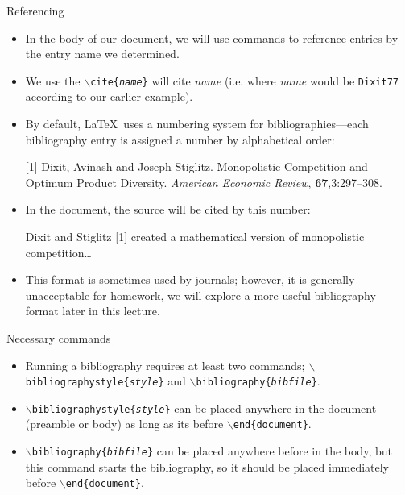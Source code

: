 \documentclass[pdf]{prosper}
\begin{document}
\begin{slide}{Referencing}
	\begin{itemize}
		\item In the body of our document, we will use commands to reference entries by the entry name we determined.
		\item We use the \texttt{$\backslash$cite\{\textit{name}\}} will cite \textit{name} (i.e. where \textit{name} would be \texttt{Dixit77} according to our earlier example).
		\item By default, \LaTeX\ uses a numbering system for bibliographies---each bibliography entry is assigned a number by alphabetical order:
			\begin{center}
				[1] Dixit, Avinash and Joseph Stiglitz. Monopolistic Competition and Optimum Product Diversity. \textit{American Economic Review}, \textbf{67},3:297--308.
			\end{center}
		\item In the document, the source will be cited by this number:
			\begin{center}
				Dixit and Stiglitz [1] created a mathematical version of monopolistic competition\ldots
			\end{center}
		\item This format is sometimes used by journals; however, it is generally unacceptable for homework, we will explore a more useful bibliography format later in this lecture.
	\end{itemize}
\end{slide}
\begin{slide}{Necessary commands}
	\begin{itemize}
		\item Running a bibliography requires at least two commands; \texttt{$\backslash$bibliographystyle\{\textit{style}\}} and \texttt{$\backslash$bibliography\{\textit{bibfile}\}}.
		\item \texttt{$\backslash$bibliographystyle\{\textit{style}\}} can be placed anywhere in the document (preamble or body) as long as its before \texttt{$\backslash$end\{document\}}. 
		\item \texttt{$\backslash$bibliography\{\textit{bibfile}\}} can be placed anywhere before in the body, but this command starts the bibliography, so it should be placed immediately before \texttt{$\backslash$end\{document\}}.
	\end{itemize}
\end{slide}
\end{document}

